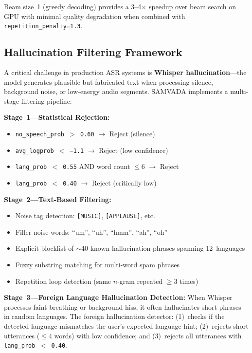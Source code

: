 \documentclass[conference]{IEEEtran}
\begin{document}
Beam size~1 (greedy decoding) provides a 3--4$\times$ speedup over beam search on GPU with minimal quality degradation when combined with \texttt{repetition\_penalty=1.3}.

\subsection{Hallucination Filtering Framework}

A critical challenge in production ASR systems is \textbf{Whisper hallucination}---the model generates plausible but fabricated text when processing silence, background noise, or low-energy audio segments. SAMVADA implements a multi-stage filtering pipeline:

\textbf{Stage~1---Statistical Rejection:}
\begin{itemize}
  \item \texttt{no\_speech\_prob $>$ 0.60} $\rightarrow$ Reject (silence)
  \item \texttt{avg\_logprob $<$ --1.1} $\rightarrow$ Reject (low confidence)
  \item \texttt{lang\_prob $<$ 0.55} AND word count $\leq 6$ $\rightarrow$ Reject
  \item \texttt{lang\_prob $<$ 0.40} $\rightarrow$ Reject (critically low)
\end{itemize}

\textbf{Stage~2---Text-Based Filtering:}
\begin{itemize}
  \item Noise tag detection: \texttt{[MUSIC]}, \texttt{[APPLAUSE]}, etc.
  \item Filler noise words: ``um'', ``uh'', ``hmm'', ``ah'', ``oh''
  \item Explicit blocklist of $\sim$40 known hallucination phrases spanning 12~languages
  \item Fuzzy substring matching for multi-word spam phrases
  \item Repetition loop detection (same $n$-gram repeated $\geq 3$ times)
\end{itemize}

\textbf{Stage~3---Foreign Language Hallucination Detection:}
When Whisper processes faint breathing or background hiss, it often hallucinates short phrases in random languages. The foreign hallucination detector: (1)~checks if the detected language mismatches the user's expected language hint; (2)~rejects short utterances ($\leq 4$ words) with low confidence; and (3)~rejects all utterances with \texttt{lang\_prob $<$ 0.40}.
\end{document}
